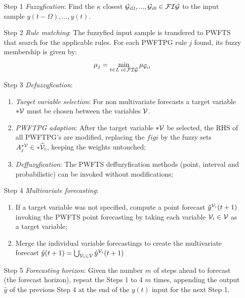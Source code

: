\begin{enumerate}
\item [Step 1] \textit{Fuzzyfication}: Find the $\kappa$ closest   $\mathcal{G}_{i\Omega},...,\mathcal{G}_{i0} \in \mathcal{FIG}$ to the input sample $y(t-\Omega),...,y(t)$. 

\item [Step 2] \textit{Rule matching}: The fuzzyfied input sample is transfered to PWFTS that search for the applicable rules. For each PWFTPG rule $j$ found, its fuzzy membership is given by:
\begin{equation}
    \mu_j = \min_{t\in L\; i \in \mathcal{FIG}} \mu_{\mathcal{G}_{it}}
\end{equation}

\item [Step 3] \textit{Defuzzyfication}: 
\begin{enumerate}
    \item \textit{Target variable selection}: For non multivariate forecasts a target variable $*\mathcal{V}$ must be chosen between the variables $\mathcal{V}$.
    \item \textit{PWFTPG adaption}: After the target variable $*\mathcal{V}$ be selected, the RHS of all PWFTPG's are modified, replacing the $figi$ by the fuzzy sets $A_j^{*\mathcal{V}} \in *\widetilde{\mathcal{V}}_i$, keeping the weights untouched;
    \item \textit{Deffuzyfication}: The PWFTS deffuzyfication methods (point, interval and probabilistic) can be invoked without modifications;
\end{enumerate}

\item [Step 4] \textit{Multivariate forecasting}:
\begin{enumerate}
    \item If a target variable was not specified, compute a point forecast $\hat{y}^{\mathcal{V}_i}(t+1)$ invoking the PWFTS point forecasting by taking each variable $\mathcal{V}_i \in \mathcal{V}$ as a target variable;
    \item Merge the individual variable forecastings to create the multivariate forecast $\hat{y}(t+1) = \bigcup_{\mathcal{V}_i \in \mathcal{V}} \hat{y}^{\mathcal{V}_i}(t+1)$ 
\end{enumerate}
 
\item [Step 5] \textit{Forecasting horizon}: Given the number $m$ of steps ahead to forecast  (the forecast horizon), repeat the Steps 1 to 4 $m$ times, appending the output $\hat{y}$ of the previous Step 4 at the end of the $y(t)$ input for the next Step 1.
\end{enumerate}

